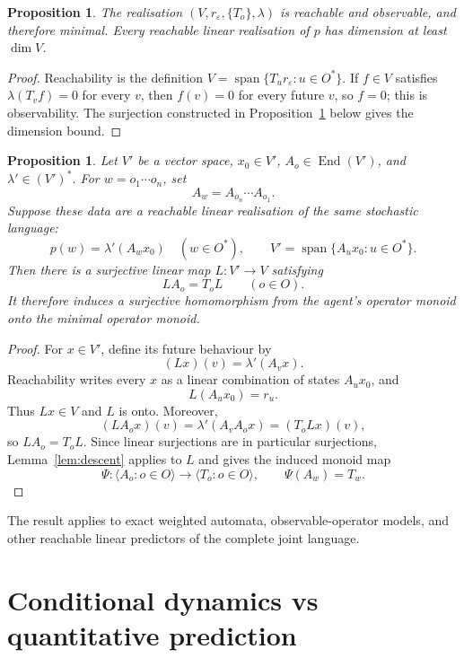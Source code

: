 \documentclass[10pt]{article}
\newtheorem{proposition}[theorem]{Proposition}
\theoremstyle{definition}
\theoremstyle{remark}
\newcommand{\End}{\operatorname{End}}
\newcommand{\spn}{\operatorname{span}}
\newcommand{\Obs}{O}
\newcommand{\eps}{\varepsilon}
\begin{document}
\begin{proposition}
The realisation $(V,r_\eps,\{T_o\},\lambda)$ is reachable and observable, and
therefore minimal.  Every reachable linear realisation of $p$ has dimension at
least $\dim V$.
\end{proposition}

\begin{proof}
Reachability is the definition $V=\spn\{T_ur_\eps:u\in\Obs^*\}$.  If
$f\in V$ satisfies $\lambda(T_vf)=0$ for every $v$, then
$f(v)=0$ for every future $v$, so $f=0$; this is observability.  The
surjection constructed in Proposition~\ref{prop:linear-quotient} below gives
the dimension bound.
\end{proof}

\begin{proposition}
\label{prop:linear-quotient}
Let $V'$ be a vector space, $x_0\in V'$, $A_o\in\End(V')$, and
$\lambda'\in(V')^*$.  For $w=o_1\cdots o_n$, set
\[
  A_w=A_{o_n}\cdots A_{o_1}.
\]
Suppose these data are a reachable linear realisation of the same stochastic
language:
\[
  p(w)=\lambda'(A_wx_0)
  \quad(w\in\Obs^*),
  \qquad
  V'=\spn\{A_ux_0:u\in\Obs^*\}.
\]
Then there is a surjective linear map $L:V'\rightarrow V$ satisfying
\[
  LA_o=T_oL
  \qquad(o\in\Obs).
\]
It therefore induces a surjective homomorphism from the agent's operator monoid
onto the minimal operator monoid.
\end{proposition}

\begin{proof}
For $x\in V'$, define its future behaviour by
\[
  (Lx)(v)=\lambda'(A_vx).
\]
Reachability writes every $x$ as a linear combination of states $A_ux_0$, and
\[
  L(A_ux_0)=r_u.
\]
Thus $Lx\in V$ and $L$ is onto.  Moreover,
\[
  (LA_ox)(v)=\lambda'(A_vA_ox)
  =(T_oLx)(v),
\]
so $LA_o=T_oL$.  Since linear surjections are in particular surjections,
Lemma~\ref{lem:descent} applies to $L$ and gives the induced monoid map
\[
  \Psi:\langle A_o:o\in\Obs\rangle\rightarrow
  \langle T_o:o\in\Obs\rangle,
  \qquad
  \Psi(A_w)=T_w.
\]
\end{proof}

The result applies to exact weighted automata, observable-operator
models, and other reachable linear predictors of the complete joint
language.

\section{Conditional dynamics vs quantitative prediction}
\label{sec:quantitative}
\end{document}
